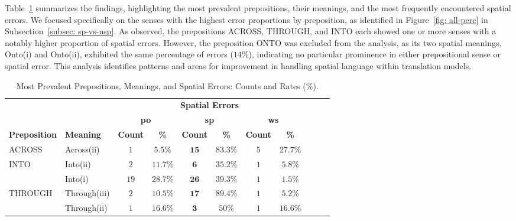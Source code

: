 Table~\ref{tab:finall} summarizes the findings, highlighting the most prevalent prepositions, their meanings, and the most frequently encountered spatial errors. We focused specifically on the senses with the highest error proportions by preposition, as identified in Figure~\ref{fig: all-perc} in Subsection~\ref{subsec: sp-vs-nsp}. As observed, the prepositions ACROSS, THROUGH, and INTO each showed one or more senses with a notably higher proportion of spatial errors. However, the preposition ONTO was excluded from the analysis, as its two spatial meanings, Onto(i) and Onto(ii), exhibited the same percentage of errors ($14\%$), indicating no particular prominence in either prepositional sense or spatial error. This analysis identifies patterns and areas for improvement in handling spatial language within translation models.

\begin{table}[htb]
\centering
\begin{tabular}{@{}llccccccccc@{}}
\toprule
& & \multicolumn{6}{c}{\textbf{Spatial Errors}} \\
\cmidrule(lr){3-8}
& & \multicolumn{2}{c}{\textbf{po}} & \multicolumn{2}{c}{\textbf{sp}} & \multicolumn{2}{c}{\textbf{ws}} \\
\cmidrule(lr){3-4} \cmidrule(lr){5-6} \cmidrule(lr){7-8}
\textbf{Preposition} & \textbf{Meaning} & \textbf{Count} & \textbf{\%} & \textbf{Count} & \textbf{\%} & \textbf{Count} & \textbf{\%} \\
\midrule
\multirow{1}{*}{ACROSS} & Across(ii) & $1$ & $5.5\%$ & $\mathbf{15}$ & $83.3\%$ & $5$ & $27.7\%$ \\
\multirow{2}{*}{INTO} & Into(ii) & $2$ & $11.7\%$ & $\mathbf{6}$ & $35.2\%$ & $1$ & $5.8\%$ \\
& Into(i) & $19$ & $28.7\%$ & $\mathbf{26}$ & $39.3\%$ & $1$ & $1.5\%$ \\
\multirow{2}{*}{THROUGH} & Through(iii) & $2$ & $10.5\%$ & $\mathbf{17}$ & $89.4\%$ & $1$ & $5.2\%$ \\
& Through(ii) & $1$ & $16.6\%$ & $\mathbf{3}$ & $50\%$ & $1$ & $16.6\%$ \\
\bottomrule
\end{tabular}
\caption{Most Prevalent Prepositions, Meanings, and Spatial Errors: Counts and Rates (\%).}
\label{tab:finall}
\end{table}


